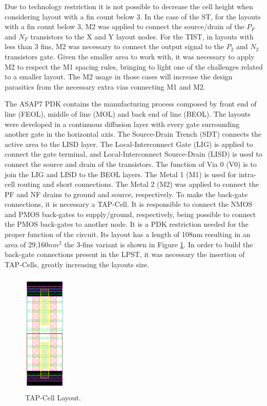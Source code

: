 \documentclass[pgmicro,diss,english]{iiufrgs}
\begin{document}


Due to technology restriction it is not possible to decrease the cell height when considering layout with a fin count below 3. In the case of the ST, for the layouts with a fin count below 3, M2 was applied to connect the source/drain of the ${P_F}$ and ${N_F}$ transistors to the X and Y layout nodes. For the TIST, in layouts with less than 3 fins, M2 was necessary to connect the output signal to the $P_2$ and $N_2$ transistors gate. Given the smaller area to work with, it was necessary to apply M2 to respect the M1 spacing rules, bringing to light one of the challenges related to a smaller layout. The M2 usage in those cases will increase the design parasitics from the necessary extra vias connecting M1 and M2.


The ASAP7 PDK contains the manufacturing process composed by front end of line (FEOL), middle of line (MOL) and back end of line (BEOL). The layouts were developed in a continuous diffusion layer with every gate surrounding another gate in the horizontal axis. The Source-Drain Trench (SDT) connects the active area to the LISD layer. The Local-Interconnect Gate (LIG) is applied to connect the gate terminal, and Local-Interconnect Source-Drain (LISD) is used to connect the source and drain of the transistors. The function of Via 0 (V0) is to join the LIG and LISD to the BEOL layers. The Metal 1 (M1) is used for intra-cell routing and short connections. The Metal 2 (M2) was applied to connect the PF and NF drains to ground and source, respectively. To make the back-gate connections, it is necessary a TAP-Cell. It is responsible to connect the NMOS and PMOS back-gates to supply/ground, respectively, being possible to connect the PMOS back-gates to another node. It is a PDK restriction needed for the proper function of the circuit. Its layout has a length of 108nm resulting in an area of 29,160$nm^{2}$ the 3-fins variant is shown in Figure \ref{tap}. In order to build the back-gate connections present in the LPST, it was necessary the insertion of TAP-Cells, greatly increasing the layouts size.

\begin{figure}[t]
\centering
\includegraphics[width=0.18\textwidth]{TAP.png}
\caption{TAP-Cell Layout.}
\label{tap}
\end{figure}
\end{document}
